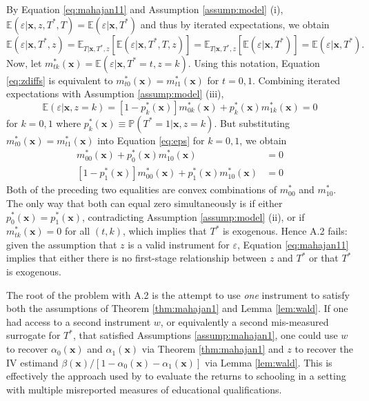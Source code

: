 By Equation \ref{eq:mahajan11} and Assumption \ref{assump:model} (i), $\mathbb{E}(\varepsilon|\mathbf{x},z,T^*,T)=\mathbb{E}(\varepsilon|\mathbf{x},T^*)$ and thus by iterated expectations, we obtain
\begin{equation}
  \mathbb{E}(\varepsilon|\mathbf{x},T^*,z) = \mathbb{E}_{T|\mathbf{x},T^*,z}\left[ \mathbb{E}(\varepsilon|\mathbf{x},T^*,T,z) \right] = \mathbb{E}_{T|\mathbf{x},T^*,z}\left[ \mathbb{E}(\varepsilon|\mathbf{x},T^*) \right] = \mathbb{E}(\varepsilon|\mathbf{x}, T^*).
  \label{eq:zdiffs}
\end{equation}
Now, let $m^*_{tk}(\mathbf{x}) = \mathbb{E}(\varepsilon|\mathbf{x}, T^*=t,z=k)$.
Using this notation, Equation \ref{eq:zdiffs} is equivalent to $m^*_{t0}(\mathbf{x}) = m^*_{t1}(\mathbf{x})$ for $t = 0, 1$.
Combining iterated expectations with Assumption \ref{assump:model} (iii), 
\begin{equation}
  \mathbb{E}(\varepsilon|\mathbf{x},z=k) = [1 - p^*_k(\mathbf{x})] m^*_{0k}(\mathbf{x}) + p^*_k(\mathbf{x}) m^*_{1k}(\mathbf{x}) = 0 
  \label{eq:eps}
\end{equation}
for $k = 0,1$ where $p^*_k(\mathbf{x}) \equiv \mathbb{P}(T^*=1|\mathbf{x}, z=k)$.
But substituting $m^*_{t0}(\mathbf{x}) = m^*_{t1}(\mathbf{x})$ into Equation \ref{eq:eps} for $k=0,1$, we obtain 
\begin{align*}
  [1 - p^*_0(\mathbf{x})] m^*_{00}(\mathbf{x}) + p^*_0(\mathbf{x}) m^*_{10}(\mathbf{x}) &= 0\\ 
  [1 - p^*_1(\mathbf{x})] m^*_{00}(\mathbf{x}) + p^*_1(\mathbf{x}) m^*_{10}(\mathbf{x}) &= 0
\end{align*}
Both of the preceding two equalities are convex combinations of $m^*_{00}$ and $m^*_{10}$.
The only way that both can equal zero simultaneously is if either $p^*_0(\mathbf{x}) = p^*_1(\mathbf{x})$, contradicting Assumption \ref{assump:model} (ii), or if $m^*_{tk}(\mathbf{x}) = 0$ for all $(t,k)$, which implies that $T^*$ is exogenous.
Hence \cite{Mahajan} A.2 fails: given the assumption that $z$ is a valid instrument for $\varepsilon$, Equation \ref{eq:mahajan11} implies that either there is no first-stage relationship between $z$ and $T^*$ or that $T^*$ is exogenous.

The root of the problem with A.2 is the attempt to use \emph{one} instrument to satisfy both the assumptions of Theorem \ref{thm:mahajan1} and Lemma \ref{lem:wald}.
If one had access to a second instrument $w$, or equivalently a second mis-measured surrogate for $T^*$, that satisfied Assumptions \ref{assump:mahajan1}, one could use $w$  to recover $\alpha_0(\mathbf{x})$ and $\alpha_1(\mathbf{x})$ via Theorem \ref{thm:mahajan1} and $z$ to recover the IV estimand $\beta(\mathbf{x}) / [1 - \alpha_0(\mathbf{x}) - \alpha_1(\mathbf{x})]$ via Lemma \ref{lem:wald}.
This is effectively the approach used by \cite{Batt} to evaluate the returns to schooling in a setting with multiple misreported measures of educational qualifications.

